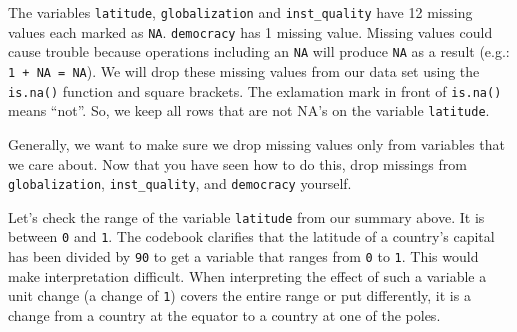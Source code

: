 \documentclass[]{article}
\newenvironment{Shaded}{\begin{snugshade}}{\end{snugshade}}
\newcommand{\KeywordTok}[1]{\textcolor[rgb]{0.13,0.29,0.53}{\textbf{#1}}}
\newcommand{\NormalTok}[1]{#1}
\newcommand{\OperatorTok}[1]{\textcolor[rgb]{0.81,0.36,0.00}{\textbf{#1}}}
\newcommand{\StringTok}[1]{\textcolor[rgb]{0.31,0.60,0.02}{#1}}
\begin{document}
The variables \texttt{latitude}, \texttt{globalization} and \texttt{inst\_quality} have 12 missing values each marked as \texttt{NA}. \texttt{democracy} has 1 missing value. Missing values could cause trouble because operations including an \texttt{NA} will produce \texttt{NA} as a result (e.g.: \texttt{1\ +\ NA\ =\ NA}). We will drop these missing values from our data set using the \texttt{is.na()} function and square brackets. The exlamation mark in front of \texttt{is.na()} means ``not''. So, we keep all rows that are not NA's on the variable \texttt{latitude}.

\begin{Shaded}
\end{Shaded}

Generally, we want to make sure we drop missing values only from variables that we care about. Now that you have seen how to do this, drop missings from \texttt{globalization}, \texttt{inst\_quality}, and \texttt{democracy} yourself.

\begin{Shaded}
\end{Shaded}

Let's check the range of the variable \texttt{latitude} from our summary above. It is between \texttt{0} and \texttt{1}. The codebook clarifies that the latitude of a country's capital has been divided by \texttt{90} to get a variable that ranges from \texttt{0} to \texttt{1}. This would make interpretation difficult. When interpreting the effect of such a variable a unit change (a change of \texttt{1}) covers the entire range or put differently, it is a change from a country at the equator to a country at one of the poles.
\end{document}
